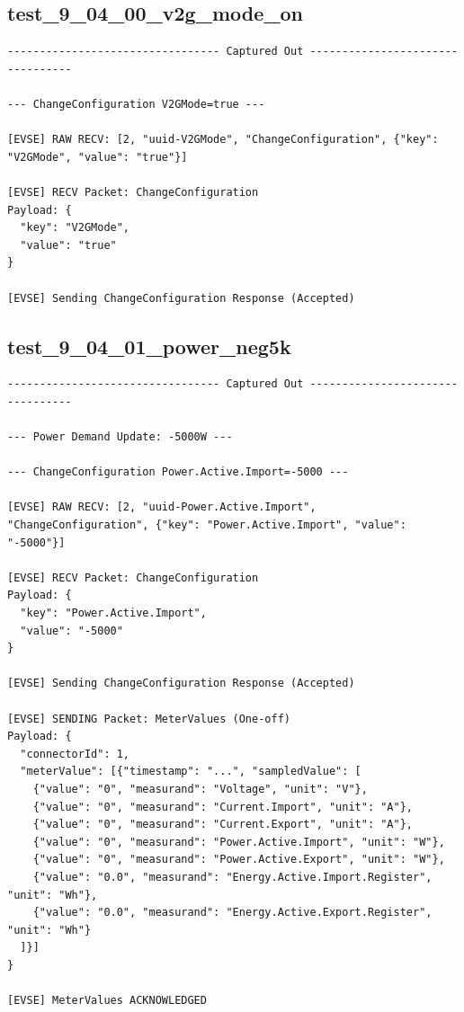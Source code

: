 \documentclass{article}
\begin{document}
\subsection*{test\_9\_04\_00\_v2g\_mode\_on}
\begin{lstlisting}
--------------------------------- Captured Out ---------------------------------

--- ChangeConfiguration V2GMode=true ---

[EVSE] RAW RECV: [2, "uuid-V2GMode", "ChangeConfiguration", {"key": "V2GMode", "value": "true"}]

[EVSE] RECV Packet: ChangeConfiguration
Payload: {
  "key": "V2GMode",
  "value": "true"
}

[EVSE] Sending ChangeConfiguration Response (Accepted)
\end{lstlisting}

\subsection*{test\_9\_04\_01\_power\_neg5k}
\begin{lstlisting}
--------------------------------- Captured Out ---------------------------------

--- Power Demand Update: -5000W ---

--- ChangeConfiguration Power.Active.Import=-5000 ---

[EVSE] RAW RECV: [2, "uuid-Power.Active.Import", "ChangeConfiguration", {"key": "Power.Active.Import", "value": "-5000"}]

[EVSE] RECV Packet: ChangeConfiguration
Payload: {
  "key": "Power.Active.Import",
  "value": "-5000"
}

[EVSE] Sending ChangeConfiguration Response (Accepted)

[EVSE] SENDING Packet: MeterValues (One-off)
Payload: {
  "connectorId": 1,
  "meterValue": [{"timestamp": "...", "sampledValue": [
    {"value": "0", "measurand": "Voltage", "unit": "V"},
    {"value": "0", "measurand": "Current.Import", "unit": "A"},
    {"value": "0", "measurand": "Current.Export", "unit": "A"},
    {"value": "0", "measurand": "Power.Active.Import", "unit": "W"},
    {"value": "0", "measurand": "Power.Active.Export", "unit": "W"},
    {"value": "0.0", "measurand": "Energy.Active.Import.Register", "unit": "Wh"},
    {"value": "0.0", "measurand": "Energy.Active.Export.Register", "unit": "Wh"}
  ]}]
}

[EVSE] MeterValues ACKNOWLEDGED
\end{lstlisting}
\end{document}
